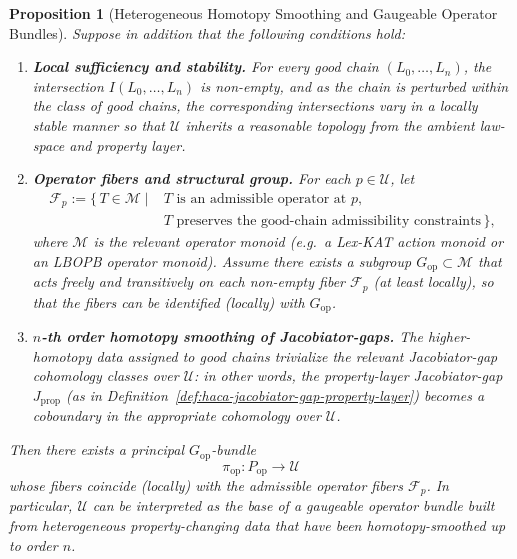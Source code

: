 \documentclass[11pt]{book}
\theoremstyle{plain}
\newtheorem{proposition}[theorem]{Proposition}
\theoremstyle{definition}
\theoremstyle{remark}
\begin{document}
\begin{proposition}[Heterogeneous Homotopy Smoothing and Gaugeable Operator Bundles]
Suppose in addition that the following conditions hold:
\begin{enumerate}
  \item \textbf{Local sufficiency and stability.}
        For every good chain $(L_0,\dots,L_n)$, the intersection
        $I(L_0,\dots,L_n)$ is non-empty, and as the chain is perturbed
        within the class of good chains, the corresponding intersections
        vary in a locally stable manner so that $\mathcal{U}$ inherits a
        reasonable topology from the ambient law-space and property layer.
  \item \textbf{Operator fibers and structural group.}
        For each $p\in\mathcal{U}$, let
        \[
        \begin{aligned}
          \mathcal{F}_p
          := \bigl\{\, T \in \mathcal{M} \;\big|\;&
          T \text{ is an admissible operator at }p,\\
          & T \text{ preserves the good-chain admissibility constraints}
          \,\bigr\},
        \end{aligned}
        \]
        where $\mathcal{M}$ is the relevant operator monoid (e.g.\ a
        Lex-KAT action monoid or an LBOPB operator monoid). Assume there
        exists a subgroup $G_{\mathrm{op}}\subset\mathcal{M}$ that acts
        freely and transitively on each non-empty fiber $\mathcal{F}_p$
        (at least locally), so that the fibers can be identified (locally)
        with $G_{\mathrm{op}}$.
  \item \textbf{$n$-th order homotopy smoothing of Jacobiator-gaps.}
        The higher-homotopy data assigned to good chains trivialize the
        relevant Jacobiator-gap cohomology classes over $\mathcal{U}$:
        in other words, the property-layer Jacobiator-gap
        $J_{\mathrm{prop}}$ (as in
        Definition~\ref{def:haca-jacobiator-gap-property-layer})
        becomes a coboundary in the appropriate cohomology over
        $\mathcal{U}$.
\end{enumerate}
Then there exists a principal $G_{\mathrm{op}}$-bundle
\[
  \pi_{\mathrm{op}} : P_{\mathrm{op}} \longrightarrow \mathcal{U}
\]
whose fibers coincide (locally) with the admissible operator fibers
$\mathcal{F}_p$. In particular, $\mathcal{U}$ can be interpreted as the
base of a gaugeable operator bundle built from heterogeneous
property-changing data that have been homotopy-smoothed up to order $n$.


\end{proposition}
\end{document}
